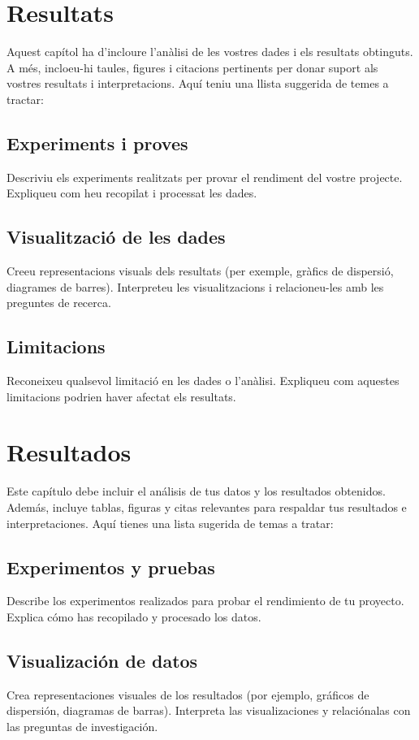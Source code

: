 \ifcase\doclanguage\or
  \chapter{Resultats}
  Aquest capítol ha d'incloure l'anàlisi de les vostres dades i els resultats obtinguts. A més, incloeu-hi taules, figures i citacions pertinents per donar suport als vostres resultats i interpretacions. Aquí teniu una llista suggerida de temes a tractar:
  
    \section{Experiments i proves}
    Descriviu els experiments realitzats per provar el rendiment del vostre projecte. Expliqueu com heu recopilat i processat les dades.
    
    \section{Visualització de les dades}
    Creeu representacions visuals dels resultats (per exemple, gràfics de dispersió, diagrames de barres). Interpreteu les visualitzacions i relacioneu-les amb les preguntes de recerca.
    
    \section{Limitacions}
    Reconeixeu qualsevol limitació en les dades o l'anàlisi. Expliqueu com aquestes limitacions podrien haver afectat els resultats.

\or
  \chapter{Resultados}
  Este capítulo debe incluir el análisis de tus datos y los resultados obtenidos. Además, incluye tablas, figuras y citas relevantes para respaldar tus resultados e interpretaciones. Aquí tienes una lista sugerida de temas a tratar:
  
    \section{Experimentos y pruebas}
    Describe los experimentos realizados para probar el rendimiento de tu proyecto. Explica cómo has recopilado y procesado los datos.
    
    \section{Visualización de datos}
    Crea representaciones visuales de los resultados (por ejemplo, gráficos de dispersión, diagramas de barras). Interpreta las visualizaciones y relaciónalas con las preguntas de investigación.
    
